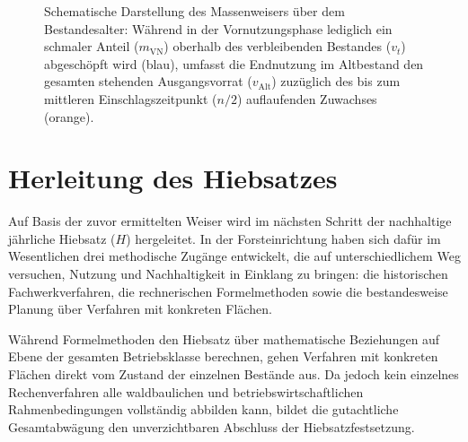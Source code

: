 \documentclass[twocolumn, paper=a4, fontsize=10pt]{scrartcl}
\begin{document}
\begin{figure}[!htbp]
  \caption{Schematische Darstellung des Massenweisers über dem Bestandesalter: Während in der Vornutzungsphase lediglich ein schmaler Anteil ($m_{\text{VN}}$) oberhalb des verbleibenden Bestandes ($v_t$) abgeschöpft wird (blau), umfasst die Endnutzung im Altbestand den gesamten stehenden Ausgangsvorrat ($v_{\text{Alt}}$) zuzüglich des bis zum mittleren Einschlagszeitpunkt ($n/2$) auflaufenden Zuwachses (orange).}
  \label{fig:massenweiser}
\end{figure}

\section{Herleitung des Hiebsatzes}

Auf Basis der zuvor ermittelten Weiser wird im nächsten Schritt der nachhaltige jährliche Hiebsatz ($H$) hergeleitet. In der Forsteinrichtung haben sich dafür im Wesentlichen drei methodische Zugänge entwickelt, die auf unterschiedlichem Weg versuchen, Nutzung und Nachhaltigkeit in Einklang zu bringen: die historischen Fachwerkverfahren, die rechnerischen Formelmethoden sowie die bestandesweise Planung über Verfahren mit konkreten Flächen. 

Während Formelmethoden den Hiebsatz über mathematische Beziehungen auf Ebene der gesamten Betriebsklasse berechnen, gehen Verfahren mit konkreten Flächen direkt vom Zustand der einzelnen Bestände aus. Da jedoch kein einzelnes Rechenverfahren alle waldbaulichen und betriebswirtschaftlichen Rahmenbedingungen vollständig abbilden kann, bildet die gutachtliche Gesamtabwägung den unverzichtbaren Abschluss der Hiebsatzfestsetzung.
\end{document}
